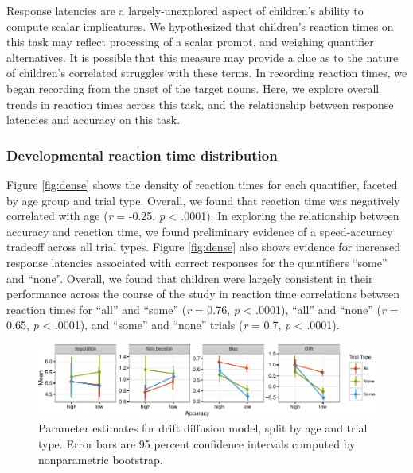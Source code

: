 \documentclass[10pt, letterpaper]{article}
\newenvironment{CodeChunk}{}{}
\begin{document}
Response latencies are a largely-unexplored aspect of children's ability
to compute scalar implicatures. We hypothesized that children's reaction
times on this task may reflect processing of a scalar prompt, and
weighing quantifier alternatives. It is possible that this measure may
provide a clue as to the nature of children's correlated struggles with
these terms. In recording reaction times, we began recording from the
onset of the target nouns. Here, we explore overall trends in reaction
times across this task, and the relationship between response latencies
and accuracy on this task.

\subsubsection{Developmental reaction time
distribution}\label{developmental-reaction-time-distribution}

Figure \ref{fig:dense} shows the density of reaction times for each
quantifier, faceted by age group and trial type. Overall, we found that
reaction time was negatively correlated with age (\emph{r} = -0.25,
\emph{p} \textless{} .0001). In exploring the relationship between
accuracy and reaction time, we found preliminary evidence of a
speed-accuracy tradeoff across all trial types. Figure \ref{fig:dense}
also shows evidence for increased response latencies associated with
correct responses for the quantifiers ``some'' and ``none''. Overall, we
found that children were largely consistent in their performance across
the course of the study in reaction time correlations between reaction
times for ``all'' and ``some'' (\emph{r} = 0.76, \emph{p} \textless{}
.0001), ``all'' and ``none'' (\emph{r} = 0.65, \emph{p} \textless{}
.0001), and ``some'' and ``none'' trials (\emph{r} = 0.7, \emph{p}
\textless{} .0001).

\begin{CodeChunk}
\begin{figure}[t]

{\centering \includegraphics{figs/param_plot-1} 

}

\caption[Parameter estimates for drift diffusion model, split by age and trial type]{Parameter estimates for drift diffusion model, split by age and trial type. Error bars are 95 percent confidence intervals computed by nonparametric bootstrap.}\label{fig:param_plot}
\end{figure}
\end{CodeChunk}
\end{document}
